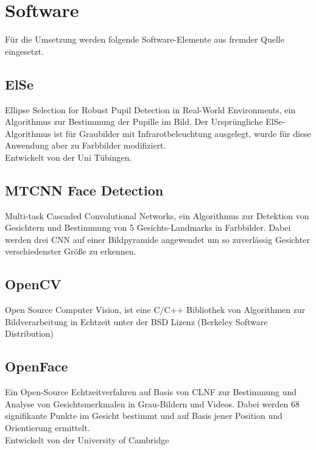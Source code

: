 \section{Software}
Für die Umsetzung werden folgende Software-Elemente aus fremder Quelle eingesetzt.
\subsection{ElSe}
Ellipse Selection for Robust Pupil Detection in Real-World Environments, ein Algorithmus zur Bestimmung der Pupille im Bild. Der Ursprüngliche ElSe-Algorithmus ist für Graubilder mit Infrarotbeleuchtung ausgelegt, wurde für diese Anwendung aber zu Farbbilder modifiziert.\\
Entwickelt von der Uni Tübingen. \cite{ElSe}
\subsection{MTCNN Face Detection}
Multi-task Cascaded Convolutional Networks, ein Algorithmus zur Detektion von Gesichtern und Bestimmung von 5 Gesichts-Landmarks in Farbbilder. Dabei werden drei CNN auf einer Bildpyramide angewendet um so zuverlässig Gesichter verschiedenster Größe zu erkennen.\\
\cite{MTCCN}
\subsection{OpenCV}
Open Source Computer Vision, ist eine C/C++ Bibliothek von Algorithmen zur Bildverarbeitung in Echtzeit unter der BSD Lizenz (Berkeley
Software Distribution)\\
\cite{wiki_Wha_is_OPenCV}\cite{OpenCv_What_Is}
\subsection{OpenFace}
Ein Open-Source Echtzeitverfahren auf Basis von CLNF zur Bestimmung und Analyse von Gesichtsmerkmalen in Grau-Bildern und Videos. Dabei werden 68 signifikante Punkte im Gesicht bestimmt und auf Basis jener Position und Orientierung ermittelt.\\
Entwickelt von der University of Cambridge \cite{OpenFace}
